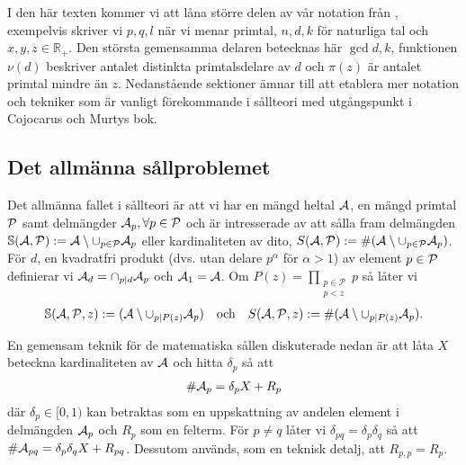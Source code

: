 
I den här texten kommer vi att låna större delen av vår notation från \cite{cojocarumurty}, exempelvis skriver vi \(p, q, l\) när vi menar primtal, \(n, d, k\) för naturliga tal och \(x, y, z \in \mathbb{R}_+\). Den största gemensamma delaren betecknas här \(\gcd{d, k}\), funktionen \(\nu(d)\) beskriver antalet distinkta primtalsdelare av \(d\) och \(\pi(z)\) är antalet primtal mindre än \(z\). Nedanstående sektioner ämnar till att etablera mer notation och tekniker som är vanligt förekommande i sållteori med utgångspunkt i Cojocarus och Murtys bok.


\subsection{Det allmänna sållproblemet}
Det allmänna fallet i sållteori är att vi har en mängd heltal \(\A\), en mängd primtal \(\P\) samt delmängder \(\A_p, \forall p \in \P\) och är intresserade av att sålla fram delmängden \(\mathbb{S}(\A, \P) := \A \setminus \cup_{p \in \P} \A_p\) eller kardinaliteten av dito, \(S(\A, \P) :=\card{(\A \setminus \cup_{p \in \P} \A_p)}\). För \(d\), en kvadratfri produkt (dvs. utan delare \(p^\alpha\) för \(\alpha > 1\)) av element \(p \in \P\) definierar vi \(\A_d = \cap_{p \divides d} \A_p\) och \(\A_1 = \A\). Om \(P(z) = \prod_{\substack{p\in \mathcal{P} \\ p < z}} p\) så låter vi
\begin{align*}
    \mathbb{S}(\A, \P, z) := (\A \setminus \cup_{p \divides P(z)} \A_p)
    \quad \text{och} \quad
    \S{A}{P}{z} := \card{(\A \setminus \cup_{p \divides P(z)} \A_p)} .
\end{align*}

En gemensam teknik för de matematiska sållen diskuterade nedan är att låta \(X\) beteckna kardinaliteten av \(\A\) och hitta \(\delta_p\) så att
\begin{align} \label{deltaX}
    \card{\A_p} = \delta_p X + R_p
\end{align}
där \(\delta_p \in [0, 1)\) kan betraktas som en uppskattning av andelen element i delmängden \(\A_p\) och \(R_p\) som en felterm. För \(p \neq q\) låter vi \(\delta_{pq} = \delta_p \delta_q\) så att \(\card{\A_{pq}} = \delta_p \delta_q X + R_{pq}\). Dessutom används, som en teknisk detalj, att \(R_{p,p} = R_p\).


